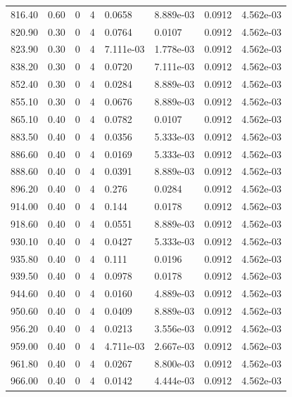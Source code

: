 \documentclass[preview]{standalone}
\begin{document}
{{{{{\begin{tabular}{L{1.2cm}C{1.2cm} C{0.3cm}C{0.5cm} C{1.4cm}C{1.4cm} C{1.4cm}C{1.4cm}}
  816.40  &  0.60  & 0     &  4 &  0.0658  & 8.889e-03  & 0.0912 &  4.562e-03   \\ 
  820.90  &  0.30  & 0     &  4 &  0.0764  & 0.0107  & 0.0912 &  4.562e-03   \\ 
  823.90  &  0.30  & 0     &  4 &  7.111e-03  & 1.778e-03  & 0.0912 &  4.562e-03   \\ 
  838.20  &  0.30  & 0     &  4 &  0.0720  & 7.111e-03  & 0.0912 &  4.562e-03   \\ 
  852.40  &  0.30  & 0     &  4 &  0.0284  & 8.889e-03  & 0.0912 &  4.562e-03   \\ 
  855.10  &  0.30  & 0     &  4 &  0.0676  & 8.889e-03  & 0.0912 &  4.562e-03   \\ 
  865.10  &  0.40  & 0     &  4 &  0.0782  & 0.0107  & 0.0912 &  4.562e-03   \\ 
  883.50  &  0.40  & 0     &  4 &  0.0356  & 5.333e-03  & 0.0912 &  4.562e-03   \\ 
  886.60  &  0.40  & 0     &  4 &  0.0169  & 5.333e-03  & 0.0912 &  4.562e-03   \\ 
  888.60  &  0.40  & 0     &  4 &  0.0391  & 8.889e-03  & 0.0912 &  4.562e-03   \\ 
  896.20  &  0.40  & 0     &  4 &  0.276  & 0.0284  & 0.0912 &  4.562e-03   \\ 
  914.00  &  0.40  & 0     &  4 &  0.144  & 0.0178  & 0.0912 &  4.562e-03   \\ 
  918.60  &  0.40  & 0     &  4 &  0.0551  & 8.889e-03  & 0.0912 &  4.562e-03   \\ 
  930.10  &  0.40  & 0     &  4 &  0.0427  & 5.333e-03  & 0.0912 &  4.562e-03   \\ 
  935.80  &  0.40  & 0     &  4 &  0.111  & 0.0196  & 0.0912 &  4.562e-03   \\ 
  939.50  &  0.40  & 0     &  4 &  0.0978  & 0.0178  & 0.0912 &  4.562e-03   \\ 
  944.60  &  0.40  & 0     &  4 &  0.0160  & 4.889e-03  & 0.0912 &  4.562e-03   \\ 
  950.60  &  0.40  & 0     &  4 &  0.0409  & 8.889e-03  & 0.0912 &  4.562e-03   \\ 
  956.20  &  0.40  & 0     &  4 &  0.0213  & 3.556e-03  & 0.0912 &  4.562e-03   \\ 
  959.00  &  0.40  & 0     &  4 &  4.711e-03  & 2.667e-03  & 0.0912 &  4.562e-03   \\ 
  961.80  &  0.40  & 0     &  4 &  0.0267  & 8.800e-03  & 0.0912 &  4.562e-03   \\ 
  966.00  &  0.40  & 0     &  4 &  0.0142  & 4.444e-03  & 0.0912 &  4.562e-03   \\ 

\end{tabular}}}}}}
\end{document}
